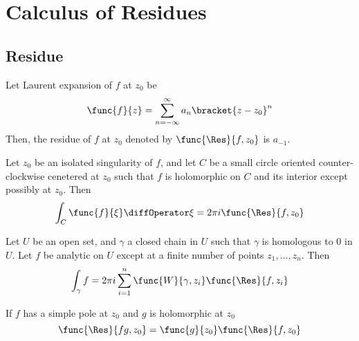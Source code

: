 \chapter{Calculus of Residues}
\section{Residue}
Let Laurent expansion of \(f\) at \(z_0\) be 
\begin{equation*}
    \func{f}{z} = \sum_{n = -\infty}^{\infty} a_n \bracket{z - z_0}^n
\end{equation*}
Then, the residue of \(f\) at \(z_0\) denoted by \(\func{\Res}{f,z_0}\) is \(a_{-1}\).
\begin{theorem}
    Let \(z_0\) be an isolated singularity of \(f\), and let \(C\) be a small circle oriented counter-clockwise cenetered at \(z_0\) such that \(f\) is holomorphic on \(C\) and its interior except possibly at \(z_0\). Then 
    \begin{equation*}
        \int_C \func{f}{\xi} \diffOperator \xi = 2\pi i \func{\Res}{f,z_0}
    \end{equation*}
\end{theorem}

\begin{theorem}
    Let \(U\) be an open set, and \(\gamma\) a closed chain in \(U\) such that \(\gamma\) is homologous to \(0\) in \(U\). Let \(f\) be analytic on \(U\) except at a finite number of points \(z_1, \dots , z_n\). Then 
    \begin{equation*}
        \int_{\gamma} f = 2 \pi i \sum_{i = 1}^n \func{W}{\gamma, z_i} \func{\Res}{f, z_i}
    \end{equation*}
\end{theorem}

\begin{lemma}
    If \(f\) has a simple pole at \(z_0\) and \(g\) is holomorphic at \(z_0\) 
    \begin{equation*}
        \func{\Res}{fg,z_0} = \func{g}{z_0} \func{\Res}{f,z_0}
    \end{equation*}
\end{lemma}

